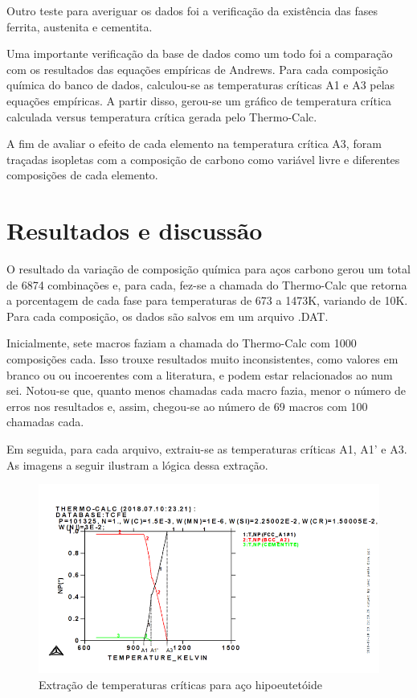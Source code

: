 \documentclass[brazil,dissertacao,epusp]{usp}
\begin{document}
Outro teste para averiguar os dados foi a verificação da existência das fases ferrita, austenita e cementita.

Uma importante verificação da base de dados como um todo foi a comparação com os resultados das equações empíricas de Andrews. Para cada composição química do banco de dados, calculou-se as temperaturas críticas A1 e A3 pelas equações empíricas. A partir disso, gerou-se um gráfico de temperatura crítica calculada versus temperatura crítica gerada pelo Thermo-Calc\textregistered{}.

A fim de avaliar o efeito de cada elemento na temperatura crítica A3, foram traçadas isopletas com a composição de carbono como variável livre e diferentes composições de cada elemento.


\chapter{Resultados e discussão}

O resultado da variação de composição química para aços carbono gerou um total de 6874 combinações e, para cada, fez-se a chamada do Thermo-Calc\textregistered{} que retorna a porcentagem de cada fase para temperaturas de 673 a 1473K, variando de 10K. Para cada composição, os dados são salvos em um arquivo .DAT.

Inicialmente, sete macros faziam a chamada do Thermo-Calc\textregistered{} com 1000 composições cada. Isso trouxe resultados muito inconsistentes, como valores em branco ou ou incoerentes com a literatura, e podem estar relacionados ao num sei. Notou-se que, quanto menos chamadas cada macro fazia, menor o número de erros nos resultados e, assim, chegou-se ao número de 69 macros com 100 chamadas cada.

Em seguida, para cada arquivo, extraiu-se as temperaturas críticas A1, A1' e A3. As imagens a seguir ilustram a lógica dessa extração.

\begin{figure}
  \includegraphics[width=.9\textwidth]{img/714editado.png}
  \caption{Extração de temperaturas críticas para aço hipoeutetóide}
  \label{fig:Tcrit_liga_hipo}
\end{figure}
\end{document}
